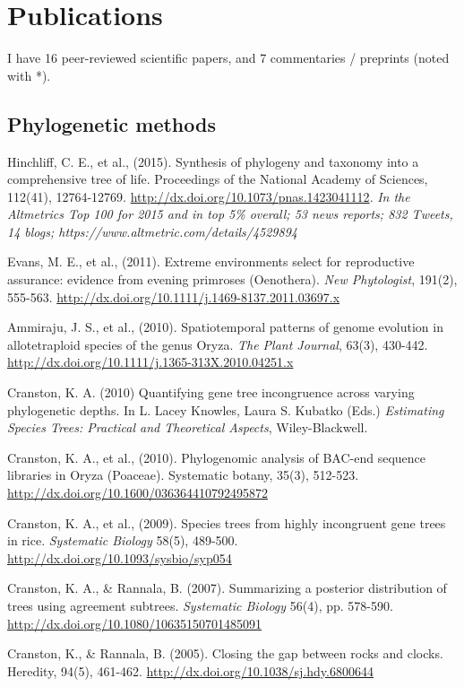\documentclass[10pt]{article}
\begin{document}
\section*{Publications}

I have 16 peer-reviewed scientific papers, and 7 commentaries / preprints (noted with *).

\subsection*{Phylogenetic methods}
Hinchliff, C. E., et al., (2015). Synthesis of phylogeny and taxonomy into a comprehensive tree of life. Proceedings of the National Academy of Sciences, 112(41), 12764-12769. \url{http://dx.doi.org/10.1073/pnas.1423041112}. \textit{In the Altmetrics Top 100 for 2015 and in top 5\% overall; 53 news reports; 832 Tweets, 14 blogs; https://www.altmetric.com/details/4529894}

Evans, M. E., et al., (2011). Extreme environments select for reproductive assurance: evidence from evening primroses (Oenothera). \textit{New Phytologist}, 191(2), 555-563. \url{http://dx.doi.org/10.1111/j.1469-8137.2011.03697.x} 

Ammiraju, J. S., et al., (2010). Spatiotemporal patterns of genome evolution in allotetraploid species of the genus Oryza. \textit{The Plant Journal}, 63(3), 430-442. \url{http://dx.doi.org/10.1111/j.1365-313X.2010.04251.x} 

Cranston, K. A. (2010) Quantifying gene tree incongruence across varying phylogenetic depths. In L. Lacey Knowles, Laura S. Kubatko (Eds.) \textit{Estimating Species Trees: Practical and Theoretical Aspects}, Wiley-Blackwell.

Cranston, K. A., et al., (2010). Phylogenomic analysis of BAC-end sequence libraries in Oryza (Poaceae). Systematic botany, 35(3), 512-523. \url{http://dx.doi.org/10.1600/036364410792495872} 

Cranston, K. A., et al., (2009). Species trees from highly incongruent gene trees in rice.  \textit{Systematic Biology} 58(5), 489-500. \url{http://dx.doi.org/10.1093/sysbio/syp054} 

Cranston, K. A., \& Rannala, B. (2007). Summarizing a posterior distribution of trees using agreement subtrees. \textit{Systematic Biology} 56(4), pp. 578-590. \\
\url{http://dx.doi.org/10.1080/10635150701485091} 

Cranston, K., \& Rannala, B. (2005). Closing the gap between rocks and clocks. Heredity, 94(5), 461-462. \url{http://dx.doi.org/10.1038/sj.hdy.6800644}
\end{document}
